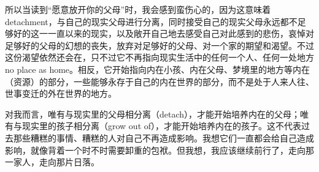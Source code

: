 所以当读到“愿意放开你的父母”时，我会感到蛮伤心的，因为这意味着detachment，与自己的现实父母进行分离，同时接受自己的现实父母永远都不足够好的这一一直以来的现实，以及敞开自己地去感受自己对此感到的悲伤，哀悼对足够好的父母的幻想的丧失，放弃对足够好的父母、对一个家的期望和渴望。不过这份渴望依然还会在，只不过它不再指向现实生活中的任何一个人、任何一处地方\pozhehao{}no place as home。相反，它开始指向内在小孩、内在父母、梦境里的地方等内在（资源）的部分，一些能够永存于自己的内在世界的部分，而不是处于人来人往、世事变迁的外在世界的地方。

对我而言，唯有与现实里的父母相分离（detach），才能开始培养内在的父母；唯有与现实里的孩子相分离（grow out of），才能开始培养内在的孩子。这不代表过去那些糟糕的事情、糟糕的人对自己不再造成影响。我想它们一直都会给自己造成影响，就像背着一个时不时需要卸重的包袱。但我想，我应该继续前行了，走向那一家人，走向那片日落。

